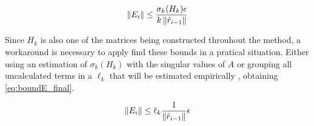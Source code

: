     \begin{equation}\label{eq:bound_E}
        \left\lVert E_{i}\right\rVert \leq \frac{\sigma_{k}(H_{k})\epsilon}{k\left\lVert\tilde{r}_{i-1}\right\rVert}
    \end{equation}

    Since $H_{k}$ is also one of the matrices being constructed throuhout the method, a workaround is necessary to apply find these bounds in a pratical situation. Either using an estimation of $\sigma_{k}(H_{k})$ with the singular values of $A$ or grouping all uncalculated terms in a $\ell_{k}$ that will be estimated empirically \cite{simoncini2003theory}, obtaining \ref{eq:boundE_final}.

    \begin{equation}\label{eq:boundE_final}
        \left\lVert E_{i}\right\rVert \leq \ell_{k} \frac{1}{\left\lVert\tilde{r}_{i-1}\right\rVert} \epsilon
    \end{equation}